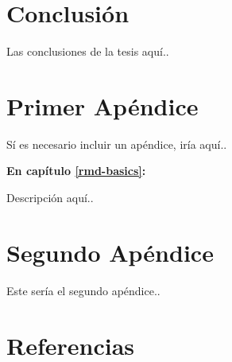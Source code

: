 \documentclass[12pt,oneside]{reedthesis}
\begin{document}
\hfill\break

\chapter*{Conclusión}\label{conclusiuxf3n-3}

Las conclusiones de la tesis aquí..

\appendix

\chapter{Primer Apéndice}\label{primer-apuxe9ndice}

Sí es necesario incluir un apéndice, iría aquí..

\textbf{En capítulo \ref{rmd-basics}:}

Descripción aquí..

\chapter{Segundo Apéndice}\label{segundo-apuxe9ndice}

Este sería el segundo apéndice..

\backmatter

\chapter*{Referencias}\label{referencias}

\printbibliography[heading=none]


\noindent

\setlength{\parindent}{-0.20in}


\end{document}
